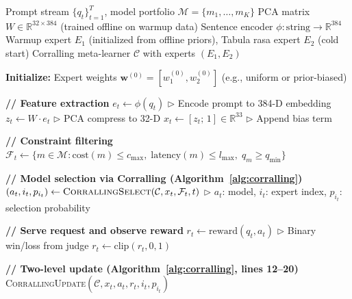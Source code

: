 \begin{algorithm}[h]
\caption{banditGPT Online Routing}
\label{alg:routing}
\begin{algorithmic}[1]

\REQUIRE Prompt stream $\{q_t\}_{t=1}^T$, model portfolio $\mathcal{M} = \{m_1, \ldots, m_K\}$
\REQUIRE PCA matrix $W \in \mathbb{R}^{32 \times 384}$ (trained offline on warmup data)
\REQUIRE Sentence encoder $\phi: \text{string} \to \mathbb{R}^{384}$
\REQUIRE Warmup expert $E_1$ (initialized from offline priors), Tabula rasa expert $E_2$ (cold start)
\REQUIRE Corralling meta-learner $\mathcal{C}$ with experts $(E_1, E_2)$

\medskip
\STATE \textbf{Initialize:} Expert weights $\mathbf{w}^{(0)} = [w_1^{(0)}, w_2^{(0)}]$ (e.g., uniform or prior-biased)

\medskip
{}
    \STATE \textbf{// Feature extraction}
    \STATE $e_t \leftarrow \phi(q_t)$ \hfill $\triangleright$ Encode prompt to 384-D embedding
    \STATE $z_t \leftarrow W \cdot e_t$ \hfill $\triangleright$ PCA compress to 32-D
    \STATE $x_t \leftarrow [z_t;\, 1] \in \mathbb{R}^{33}$ \hfill $\triangleright$ Append bias term
    
    \medskip
    \STATE \textbf{// Constraint filtering}
    \STATE $\mathcal{F}_t \leftarrow \{m \in \mathcal{M} : \text{cost}(m) \leq c_{\max},\; \text{latency}(m) \leq l_{\max},\; q_m \geq q_{\min}\}$
    
    \medskip
    \STATE \textbf{// Model selection via Corralling (Algorithm~\ref{alg:corralling})}
    \STATE $(a_t, i_t, p_{i_t}) \leftarrow \textsc{CorrallingSelect}(\mathcal{C}, x_t, \mathcal{F}_t, t)$
    \hfill $\triangleright$ $a_t$: model, $i_t$: expert index, $p_{i_t}$: selection probability
    
    \medskip
    \STATE \textbf{// Serve request and observe reward}
    \STATE $r_t \leftarrow \text{reward}(q_t, a_t)$ \hfill $\triangleright$ Binary win/loss from judge
    \STATE $r_t \leftarrow \text{clip}(r_t, 0, 1)$
    
    \medskip
    \STATE \textbf{// Two-level update (Algorithm~\ref{alg:corralling}, lines 12--20)}
    \STATE \textsc{CorrallingUpdate}$(\mathcal{C}, x_t, a_t, r_t, i_t, p_{i_t})$
\ENDFOR

\end{algorithmic}
\end{algorithm}


